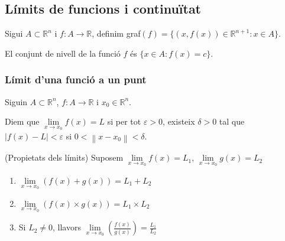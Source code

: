 \documentclass[../main.tex]{subfiles}
\begin{document}
    \subsection{Límits de funcions i continuïtat}
    \begin{definicio}
        Sigui $A \subset \mathbb{R}^n$ i $f: A\rightarrow \mathbb{R}$, definim graf$\left( f \right) = \{(x, f\left( x \right)) \in \mathbb{R}^{n+1}: x\in A\}$.
    \end{definicio}
    \begin{definicio}
        El conjunt de nivell de la funció $f$ és $\{x \in A: f\left( x \right) = c\}$.
    \end{definicio}

    \subsubsection{Límit d'una funció a un punt}
    Siguin $A \subset \mathbb{R}^n$, $f: A \rightarrow \mathbb{R}$ i $x_0 \in \mathbb{R}^n$.
    \begin{definicio}
        Diem que $\lim\limits_{x\rightarrow x_0} f\left( x \right) = L$ si per tot $\varepsilon > 0$, existeix $\delta > 0$
        tal que $|f\left( x \right)-L| < \varepsilon$ si $0 < \left\lVert x-x_0\right\rVert < \delta$.
    \end{definicio}
    \begin{corolari}(Propietats dels límits)
        Suposem $\lim\limits_{x\rightarrow x_0} f\left( x \right) = L_1$, $\lim\limits_{x\rightarrow x_0} g\left( x \right) = L_2$
        \begin{enumerate}
            \item $\lim\limits_{x\rightarrow x_0} (f\left( x \right) + g\left( x \right)) = L_1 + L_2$
            \item $\lim\limits_{x\rightarrow x_0} (f\left( x \right) \times g\left( x \right)) = L_1 \times L_2$
            \item Si $L_2 \neq 0$, llavors $\lim\limits_{x\rightarrow x_0} (\frac{f\left( x \right)}{g\left( x \right)}) = \frac{L_1}{L_2}$ 
        \end{enumerate}
    \end{corolari}
\end{document}
